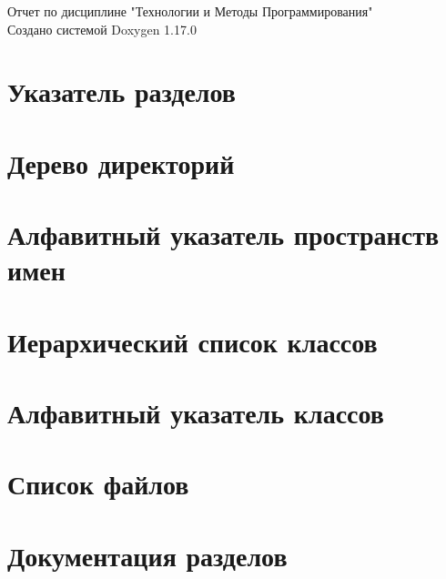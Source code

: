 \documentclass[twoside]{book}
\newcommand{\+}{\discretionary{\mbox{\scriptsize$\hookleftarrow$}}{}{}}
\newcommand{\clearemptydoublepage}{%
    \newpage{\pagestyle{empty}\cleardoublepage}%
  }
\begin{document}
  \raggedbottom
    \hypersetup{pageanchor=false,
                bookmarksnumbered=true,
                pdfencoding=unicode
               }
  \begin{titlepage}
  \vspace*{7cm}
  \begin{center}%
  {\Large Отчет по дисциплине "{}Технологии и Методы Программирования"{}}\\
  \vspace*{1cm}
  {\large Создано системой Doxygen 1.17.0}\\
  \end{center}
  \end{titlepage}
  \clearemptydoublepage
  \tableofcontents
  \clearemptydoublepage
  \hypersetup{pageanchor=true}
\chapter{Указатель разделов}

\chapter{Дерево директорий}

\chapter{Алфавитный указатель пространств имен}

\chapter{Иерархический список классов}

\chapter{Алфавитный указатель классов}

\chapter{Список файлов}

\chapter{Документация разделов}


\end{document}
